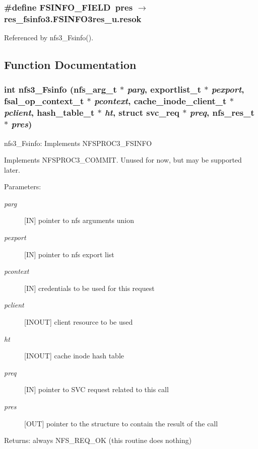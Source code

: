 \subsubsection{\setlength{\rightskip}{0pt plus 5cm}\#define FSINFO\_\-FIELD\ pres $\rightarrow$ res\_\-fsinfo3.FSINFO3res\_\-u.resok}\label{nfs3__Fsinfo_8c_a0}




Referenced by nfs3\_\-Fsinfo().

\subsection{Function Documentation}
\subsubsection{\setlength{\rightskip}{0pt plus 5cm}int nfs3\_\-Fsinfo (nfs\_\-arg\_\-t $\ast$ {\em parg}, exportlist\_\-t $\ast$ {\em pexport}, fsal\_\-op\_\-context\_\-t $\ast$ {\em pcontext}, cache\_\-inode\_\-client\_\-t $\ast$ {\em pclient}, hash\_\-table\_\-t $\ast$ {\em ht}, struct svc\_\-req $\ast$ {\em preq}, nfs\_\-res\_\-t $\ast$ {\em pres})}\label{nfs3__Fsinfo_8c_a1}


nfs3\_\-Fsinfo: Implements NFSPROC3\_\-FSINFO

Implements NFSPROC3\_\-COMMIT. Unused for now, but may be supported later.

\begin{Desc}
\item[Parameters:]
\begin{description}
\item[{\em parg}][IN] pointer to nfs arguments union \item[{\em pexport}][IN] pointer to nfs export list \item[{\em pcontext}][IN] credentials to be used for this request \item[{\em pclient}][INOUT] client resource to be used \item[{\em ht}][INOUT] cache inode hash table \item[{\em preq}][IN] pointer to SVC request related to this call \item[{\em pres}][OUT] pointer to the structure to contain the result of the call\end{description}
\end{Desc}
\begin{Desc}
\item[Returns:]always NFS\_\-REQ\_\-OK (this routine does nothing) \end{Desc}


